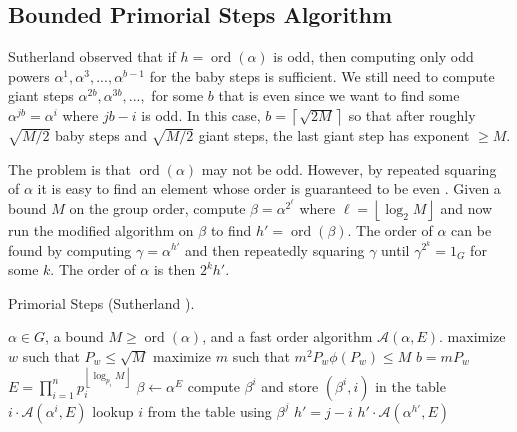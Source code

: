 \documentclass{ucalgthes1}
\theoremstyle{definition}
\DeclareMathOperator{\ord}{ord}
\newcommand{\floor}[1]{\left\lfloor #1 \right\rfloor}
\newcommand{\ceil}[1]{\left\lceil #1 \right\rceil}
\begin{document}
\subsection{Bounded Primorial Steps Algorithm}

Sutherland observed \cite[p.56]{Sutherland2007} that if $h = \ord(\alpha)$ is odd, then computing only odd powers $\alpha^1, \alpha^3, ..., \alpha^{b-1}$ for the baby steps is sufficient.  We still need to compute giant steps $\alpha^{2b}, \alpha^{3b}, ...,$ for some $b$ that is even since we want to find some $\alpha^{jb} = \alpha^i$ where $jb - i$ is odd.  In this case, $b = \ceil{\sqrt{2M}}$ so that after roughly $\sqrt{M/2}$ baby steps and $\sqrt{M/2}$ giant steps, the last giant step has exponent $\ge M$.

The problem is that $\ord(\alpha)$ may not be odd.  However, by repeated squaring of $\alpha$ it is easy to find an element whose order is guaranteed to be even \cite[p.56]{Sutherland2007}.  Given a bound $M$ on the group order, compute $\beta = \alpha^{2^\ell}$ where $\ell = \floor{\log_2 M}$ and now run the modified algorithm on $\beta$ to find $h' = \ord(\beta)$.  The order of $\alpha$ can be found by computing $\gamma = \alpha^{h'}$ and then repeatedly squaring $\gamma$ until $\gamma^{2^k} = 1_G$ for some $k$.  The order of $\alpha$ is then $2^k h'$.

\begin{algorithm}[h]
\caption{Primorial Steps (Sutherland \cite[p.57]{Sutherland2007}).}
\label{alg:primorial}
\begin{algorithmic}[1]
\REQUIRE $\alpha \in G$, a bound $M \ge \ord(\alpha)$, and a fast order algorithm $\mathcal A(\alpha, E)$.
\STATE maximize $w$ such that $P_w \le \sqrt{M}$
\STATE maximize $m$ such that $m^2P_w\phi(P_w) \le M$
\STATE $b = mP_w$
\STATE $E = \prod_{i=1}^n p_i^{\floor{\log_{p_i} M}}$
\STATE $\beta \gets \alpha^E$
	\STATE compute $\beta^i$ and store $(\beta^i, i)$ in the table 
		\RETURN $i \cdot \mathcal A(\alpha^i, E)$
	\ENDIF
\ENDFOR
{}
		\STATE lookup $i$ from the table using $\beta^j$ 
		\STATE $h' = j - i$
		\RETURN $h' \cdot \mathcal A(\alpha^{h'}, E)$
	\ENDIF
\ENDFOR
\end{algorithmic}
\end{algorithm}
\end{document}
